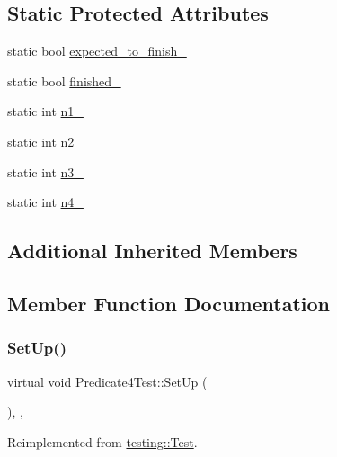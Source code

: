 \subsection*{Static Protected Attributes}
\begin{DoxyCompactItemize}
\item 
static bool \hyperlink{class_predicate4_test_a20600b5eda187c42ce4e812e77269654}{expected\+\_\+to\+\_\+finish\+\_\+}
\item 
static bool \hyperlink{class_predicate4_test_acfd174bf9dfb5a91afbcdca17e797888}{finished\+\_\+}
\item 
static int \hyperlink{class_predicate4_test_a8eb30cd283e613f7a2e501a3969be9ae}{n1\+\_\+}
\item 
static int \hyperlink{class_predicate4_test_a088fce743c747e3851c926cb3a87fda3}{n2\+\_\+}
\item 
static int \hyperlink{class_predicate4_test_a00ae6ae54c7d6639d448c036aedb6114}{n3\+\_\+}
\item 
static int \hyperlink{class_predicate4_test_ae42e23ce11e3f1c6b813496d6180cc67}{n4\+\_\+}
\end{DoxyCompactItemize}
\subsection*{Additional Inherited Members}


\subsection{Member Function Documentation}
\mbox{\label{class_predicate4_test_afcf9db5dc68e97291813cdfeb2aaa5d2}} 
\subsubsection{\texorpdfstring{Set\+Up()}{SetUp()}}
{\footnotesize\ttfamily virtual void Predicate4\+Test\+::\+Set\+Up (\begin{DoxyParamCaption}{ }\end{DoxyParamCaption})\hspace{0.3cm}{\ttfamily [inline]}, {\ttfamily [protected]}, {\ttfamily [virtual]}}



Reimplemented from \hyperlink{classtesting_1_1_test_a190315150c303ddf801313fd1a777733}{testing\+::\+Test}.

